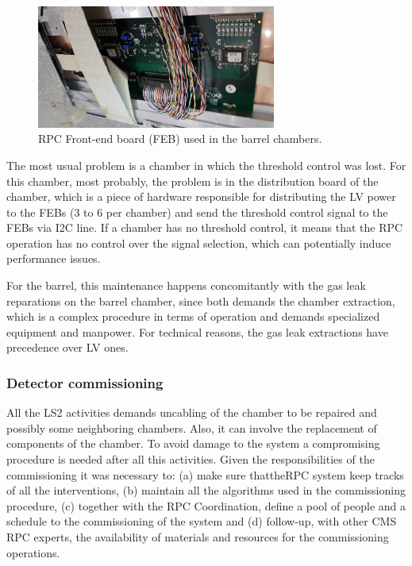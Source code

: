 \begin{figure}[h]
\begin{center}
\includegraphics[width=0.7\textwidth,keepaspectratio]{figures_and_tables/rpc/rpc_feb.jpg}
\end{center}
\caption{RPC Front-end board (FEB) used in the barrel chambers.}\label{rpc_feb}
\end{figure}

The most usual problem is a chamber in which the threshold control was lost. For this chamber, most probably, the problem is in the distribution board of the chamber, which is a piece of hardware responsible for distributing the LV power to the FEBs (3 to 6 per chamber) and send the threshold control signal to the FEBs via I2C line. If a chamber has no threshold control, it means that the RPC operation has no control over the signal selection, which can potentially induce performance issues. 

For the barrel, this maintenance happens concomitantly with the gas leak reparations on the barrel chamber, since both demands the chamber extraction, which is a complex procedure in terms of operation and demands specialized equipment and manpower. For technical reasons, the gas leak extractions have precedence over LV ones.



\subsubsection{Detector commissioning}
 
All the LS2 activities demands uncabling of the chamber to be repaired and possibly some neighboring chambers. Also, it can involve the replacement of components of the chamber. To avoid damage to the system a compromising procedure is needed after all this activities. Given the responsibilities of the commissioning it was necessary to: (a) make sure thattheRPC system keep tracks of all the interventions, (b) maintain all the algorithms used in the commissioning procedure, (c) together with the RPC Coordination, define a pool of people and a schedule to the commissioning of the system and (d) follow-up, with other CMS RPC experts, the availability of materials and resources for the commissioning operations.


